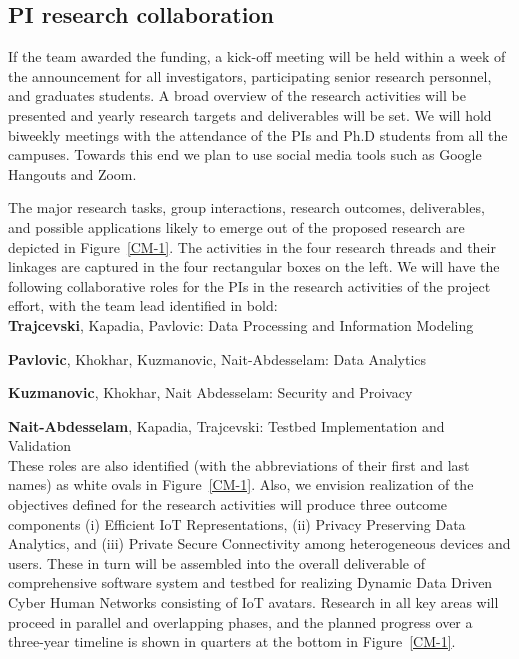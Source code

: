 \subsection{PI research collaboration} 
If the team awarded the funding, a kick-off meeting will be held within a week of the announcement for all investigators, participating senior research personnel, and graduates students. A broad overview of the research activities will be presented and yearly research targets and deliverables will be set. We will hold biweekly meetings with the attendance of the PIs and Ph.D students from all the campuses. Towards this end we plan to use social media tools such as Google Hangouts and Zoom.

The major research tasks, group interactions, research outcomes, deliverables, and possible applications likely to emerge out of the proposed research are depicted in Figure~\ref{CM-1}. The activities in the four research threads and their linkages are captured in the four rectangular boxes on the left. We will have the following collaborative roles for the PIs in the research activities of the project effort, with the team lead identified in bold:\\

\textbf{Trajcevski}, Kapadia, Pavlovic: Data Processing and Information Modeling 

\textbf{Pavlovic}, Khokhar, Kuzmanovic, Nait-Abdesselam: Data Analytics

\textbf{Kuzmanovic}, Khokhar, Nait Abdesselam: Security and Proivacy

\textbf{Nait-Abdesselam}, Kapadia, Trajcevski: Testbed Implementation and Validation \\

These roles are also identified (with the abbreviations of their first and last names) as white ovals in Figure~\ref{CM-1}. Also, we envision realization of the objectives defined for the research activities will produce three outcome components (i) Efficient IoT Representations, (ii) Privacy Preserving Data Analytics, and (iii) Private Secure Connectivity among heterogeneous devices and users. These in turn will be assembled into the overall deliverable of comprehensive software system and testbed for realizing Dynamic Data Driven Cyber Human Networks consisting of IoT avatars. Research in all key areas will proceed in parallel and overlapping phases, and the planned progress over a three-year timeline is shown in quarters at the bottom in Figure~\ref{CM-1}. 

